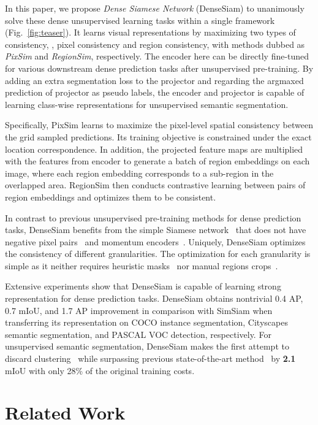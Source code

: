 \documentclass[runningheads]{llncs}
\newcommand{\bd}[1]{\textbf{#1}}
\begin{document}
In this paper, we propose \textit{Dense Siamese Network} (DenseSiam) to unanimously solve these dense unsupervised learning tasks within a single framework (Fig.~\ref{fig:teaser}).
It learns visual representations by maximizing two types of consistency, \ie, pixel consistency and region consistency, with methods dubbed as \emph{PixSim} and \emph{RegionSim}, respectively. 
The encoder here can be directly fine-tuned for various downstream dense prediction tasks after unsupervised pre-training.
By adding an extra segmentation loss to the projector and regarding the argmaxed prediction of projector as pseudo labels,
the encoder and projector is capable of learning class-wise representations for unsupervised semantic segmentation.

Specifically, PixSim learns to maximize the pixel-level spatial consistency between the grid sampled predictions. 
Its training objective is constrained under the exact location correspondence. 
In addition, the projected feature maps are multiplied with the features from encoder to generate a batch of region embeddings on each image, where each region embedding corresponds to a sub-region in the overlapped area.
RegionSim then conducts contrastive learning between pairs of region embeddings and optimizes them to be consistent. 


In contrast to previous unsupervised pre-training methods for dense prediction tasks, DenseSiam benefits from the simple Siamese network~\cite{simsiam} that does not have negative pixel pairs~\cite{densecl, pixpro} and momentum encoders~\cite{pixpro, scrl}. 
Uniquely, DenseSiam optimizes the consistency of different granularities.
The optimization for each granularity is simple as it neither requires heuristic masks~\cite{detcon} nor manual regions crops~\cite{resim, scrl, detco}.


Extensive experiments show that DenseSiam is capable of learning strong representation for dense prediction tasks.
DenseSiam obtains nontrivial 0.4 AP, 0.7 mIoU, and 1.7 AP improvement in comparison with SimSiam when transferring its representation on COCO instance segmentation, Cityscapes semantic segmentation, and PASCAL VOC detection, respectively.
For unsupervised semantic segmentation, DenseSiam makes the first attempt to discard clustering~\cite{picie, iic} while surpassing previous state-of-the-art method~\cite{picie} by \bd{2.1} mIoU with only 28\% of the original training costs.
 \section{Related Work}
\end{document}
